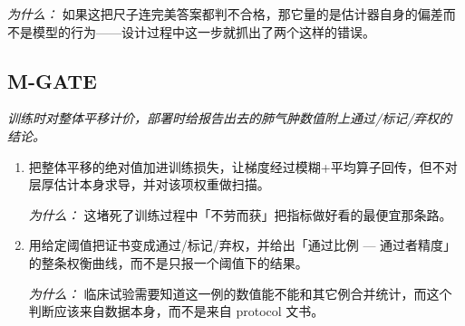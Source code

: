 \documentclass[10pt,a4paper]{article}
\begin{document}
\begin{enumerate}[leftmargin=*,start=3]
\par{}
\par\emph{为什么：} 如果这把尺子连完美答案都判不合格，那它量的是估计器自身的偏差而不是模型的行为------设计过程中这一步就抓出了两个这样的错误。
\end{enumerate}
\subsection*{M-GATE}
\emph{训练时对整体平移计价，部署时给报告出去的肺气肿数值附上通过/标记/弃权的结论。}
\begin{enumerate}[leftmargin=*,start=6]
  \item 把整体平移的绝对值加进训练损失，让梯度经过模糊+平均算子回传，但不对层厚估计本身求导，并对该项权重做扫描。
\par\emph{为什么：} 这堵死了训练过程中「不劳而获」把指标做好看的最便宜那条路。
  \item 用给定阈值把证书变成通过/标记/弃权，并给出「通过比例 --- 通过者精度」的整条权衡曲线，而不是只报一个阈值下的结果。
\par\emph{为什么：} 临床试验需要知道这一例的数值能不能和其它例合并统计，而这个判断应该来自数据本身，而不是来自 protocol 文书。
\end{enumerate}
\end{document}
